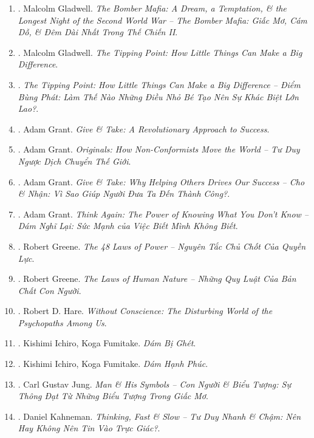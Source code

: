 \documentclass{article}
\begin{document}
\begin{enumerate}
	\item \cite{Gladwell_bomber_mafia}. Malcolm Gladwell. {\it The Bomber Mafia: A Dream, a Temptation, \& the Longest Night of the Second World War -- The Bomber Mafia: Giấc Mơ, Cám Dỗ, \& Đêm Dài Nhất Trong Thế Chiến II}.\hfill{\sf[done]}
	\item \cite{Gladwell2022}. Malcolm Gladwell. {\it The Tipping Point: How Little Things Can Make a Big Difference}.\hfill{\sf[reading]}
	\item \cite{Gladwell_tipping_point}. {\it The Tipping Point: How Little Things Can Make a Big Difference -- Điểm Bùng Phát: Làm Thế Nào Những Điều Nhỏ Bé Tạo Nên Sự Khác Biệt Lớn Lao?}.\hfill{\sf[done]}
	\item \cite{Grant2013}. Adam Grant. {\it Give \& Take: A Revolutionary Approach to Success}.\hfill{\sf[reading]}
	\item \cite{Grant2020}. Adam Grant. {\it Originals: How Non-Conformists Move the World -- Tư Duy Ngược Dịch Chuyển Thế Giới}.\hfill{\sf[done]}
	\item \cite{Grant2022a}. Adam Grant. {\it Give \& Take: Why Helping Others Drives Our Success -- Cho \& Nhận: Vì Sao Giúp Người Đưa Ta Đến Thành Công?}.\hfill{\sf[done]}
	\item \cite{Grant2022b}. Adam Grant. {\it Think Again: The Power of Knowing What You Don't Know -- Dám Nghĩ Lại: Sức Mạnh của Việc Biết Mình Không Biết}.\hfill{\sf[done]}
	\item \cite{Greene_laws_power}. Robert Greene. {\it The 48 Laws of Power -- Nguyên Tắc Chủ Chốt Của Quyền Lực}.\hfill{\sf[done]}
	\item \cite{Greene_laws_human_nature}. Robert Greene. {\it The Laws of Human Nature -- Những Quy Luật Của Bản Chất Con Người}.\hfill{\sf[done]}
	\item \cite{Hare1999}. Robert D. Hare. {\it Without Conscience: The Disturbing World of the Psychopaths Among Us}.\hfill{\sf[reading]}
	\item \cite{Ichiro_Fumitake2022a}. Kishimi Ichiro, Koga Fumitake. {\it Dám Bị Ghét}.\hfill{\sf[done]}
	\item \cite{Ichiro_Fumitake2022b}. Kishimi Ichiro, Koga Fumitake. {\it Dám Hạnh Phúc}.\hfill{\sf[done]}
	\item \cite{Jung2022}. Carl Gustav Jung. {\it Man \& His Symbols -- Con Người \& Biểu Tượng: Sự Thông Đạt Từ Những Biểu Tượng Trong Giấc Mơ}.\hfill{\sf[done]}
	\item \cite{Kahneman2022}. Daniel Kahneman. {\it Thinking, Fast \& Slow -- Tư Duy Nhanh \& Chậm: Nên Hay Không Nên Tin Vào Trực Giác?}.\\\mbox{}\hfill{\sf[done]}

\end{enumerate}
\end{document}
